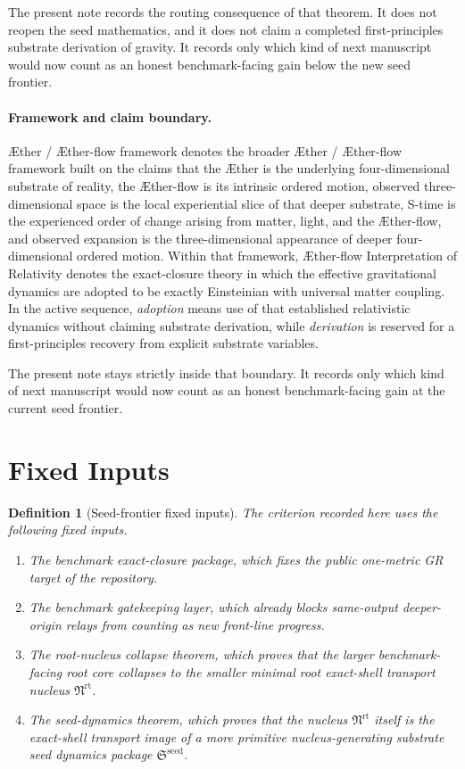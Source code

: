\documentclass[11pt]{article}
\newcommand{\Aether}{\AE{}ther}
\newcommand{\Aflow}{\AE{}ther-flow}
\newcommand{\TheoryName}{\Aflow{} Interpretation of Relativity}
\newcommand{\TheoryProgram}{\Aether{} / \Aflow{} framework}
\newcommand{\RootNucleus}{\mathfrak N^{\mathrm{rt}}}
\newcommand{\SeedPackage}{\mathfrak S^{\mathrm{seed}}}
\newtheorem{definition}{Definition}
\begin{document}
The present note records the routing consequence of that theorem. It does not reopen the seed mathematics, and it does not claim a completed first-principles substrate derivation of gravity. It records only which kind of next manuscript would now count as an honest benchmark-facing gain below the new seed frontier.

\paragraph{Framework and claim boundary.}
\TheoryProgram{} denotes the broader \Aether{} / \Aflow{} framework built on the claims that the \Aether{} is the underlying four-dimensional substrate of reality, the \Aflow{} is its intrinsic ordered motion, observed three-dimensional space is the local experiential slice of that deeper substrate, S-time is the experienced order of change arising from matter, light, and the \Aflow{}, and observed expansion is the three-dimensional appearance of deeper four-dimensional ordered motion. Within that framework, \TheoryName{} denotes the exact-closure theory in which the effective gravitational dynamics are adopted to be exactly Einsteinian with universal matter coupling. In the active sequence, \emph{adoption} means use of that established relativistic dynamics without claiming substrate derivation, while \emph{derivation} is reserved for a first-principles recovery from explicit substrate variables.

The present note stays strictly inside that boundary. It records only which kind of next manuscript would now count as an honest benchmark-facing gain at the current seed frontier.

\section{Fixed Inputs}

\begin{definition}[Seed-frontier fixed inputs]
The criterion recorded here uses the following fixed inputs.
\begin{enumerate}
    \item The benchmark exact-closure package, which fixes the public one-metric GR target of the repository.
    \item The benchmark gatekeeping layer, which already blocks same-output deeper-origin relays from counting as new front-line progress.
    \item The root-nucleus collapse theorem, which proves that the larger benchmark-facing root core collapses to the smaller minimal root exact-shell transport nucleus \(\RootNucleus\).
    \item The seed-dynamics theorem, which proves that the nucleus \(\RootNucleus\) itself is the exact-shell transport image of a more primitive nucleus-generating substrate seed dynamics package \(\SeedPackage\).
\end{enumerate}
\end{definition}
\end{document}
